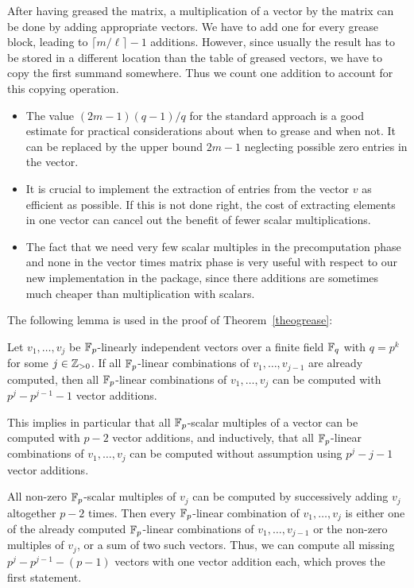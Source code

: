 After having greased the matrix, a multiplication of a vector by 
the matrix can be done by adding appropriate vectors. We have to add
one for every grease block, leading to $\lceil m/\ell \rceil - 1$ additions.
However, since usually the result has to be stored in a different location
than the table of greased vectors, we have to copy the first summand
somewhere. Thus we count one addition to account for this copying operation.
\ProofEnd

\begin{Rems}
\begin{itemize}
\item The value $(2m-1)(q-1)/q$ for the standard approach is a
good estimate for practical considerations about when to grease and when
not. It can be replaced by the upper bound $2m-1$ neglecting
possible zero entries in the vector.
\item It is crucial to implement the extraction of entries
from the vector $v$ as efficient as possible. If this is not done
right, the cost of extracting elements in one vector can cancel out
the benefit of fewer scalar multiplications.
\item The fact that we need very few scalar multiples in the
precomputation phase and none in the vector times matrix phase is
very useful with respect to our new implementation in the
{\cvec} package, since there additions are sometimes much cheaper
than multiplication with scalars.
\end{itemize}
\end{Rems}
 
The following lemma is used in the proof of Theorem~\ref{theogrease}:

\begin{Lemm}
\label{alllinkomb}
Let $v_1, \ldots, v_{j}$ be $\mathbb{F}_p$-linearly  
independent vectors over a finite field $\mathbb{F}_q$ with $q = p^k$
for some $j \in \mathbb{Z}_{> 0}$. If
all $\mathbb{F}_p$-linear combinations of $v_1, \ldots, v_{j-1}$ are already
computed, then all $\mathbb{F}_p$-linear combinations of $v_1, \ldots, v_j$ can
be computed with $p^j - p^{j-1} - 1$ vector additions.

This implies in particular that all $\mathbb{F}_p$-scalar multiples of a vector
can be computed with $p-2$ vector additions, and inductively, that
all $\mathbb{F}_p$-linear combinations of $v_1, \ldots, v_j$ can be computed
without assumption using $p^j-j-1$ vector additions.
\end{Lemm}
\Proof All non-zero $\mathbb{F}_p$-scalar multiples of $v_j$ can be computed by
successively adding $v_j$ altogether $p-2$ times. Then every $\mathbb{F}_p$-linear
combination of $v_1, \ldots, v_j$ is either one of the already
computed $\mathbb{F}_p$-linear combinations of $v_1, \ldots, v_{j-1}$ or the
non-zero multiples of $v_j$, or a sum of two such vectors. Thus, we 
can compute all missing $p^j - p^{j-1} - (p-1)$ vectors with one
vector addition each, which proves the first statement. 

